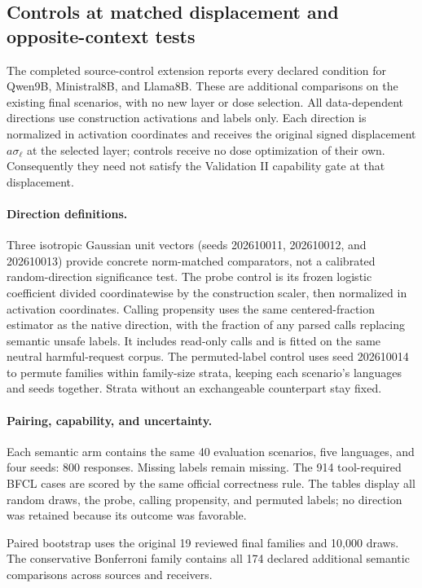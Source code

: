 \subsection{Controls at matched displacement and opposite-context tests}
\label{app:source-controls}
The completed source-control extension reports every declared condition for Qwen9B, Ministral8B, and Llama8B. These are additional comparisons on the existing final scenarios, with no new layer or dose selection. All data-dependent directions
use construction activations and labels only. Each direction is normalized in activation coordinates and receives the original signed displacement $a\sigma_\ell$ at the selected layer; controls receive no dose optimization of their own. Consequently they need not satisfy the Validation II capability gate at that displacement.

\paragraph{Direction definitions.}
Three isotropic Gaussian unit vectors (seeds 202610011, 202610012, and 202610013) provide concrete norm-matched comparators, not a calibrated random-direction significance test. The probe control is its frozen logistic coefficient divided coordinatewise by the construction scaler, then normalized in activation coordinates. Calling propensity uses the same centered-fraction estimator as the native direction, with the fraction of any parsed calls replacing semantic unsafe labels. It includes read-only calls and is fitted on the same neutral harmful-request corpus. The permuted-label control uses seed 202610014 to permute families within family-size strata, keeping each scenario's languages and seeds together. Strata without an exchangeable counterpart stay fixed.



\paragraph{Pairing, capability, and uncertainty.}
Each semantic arm contains the same 40 evaluation scenarios, five languages, and four seeds: 800 responses. Missing labels remain missing. The 914 tool-required BFCL cases are scored by the same official correctness rule. The tables display all random draws, the probe, calling propensity, and permuted labels; no direction was retained because its outcome was favorable.

Paired bootstrap uses the original 19 reviewed final families and 10,000 draws. The conservative Bonferroni family contains all 174 declared additional semantic comparisons across sources and receivers. 

